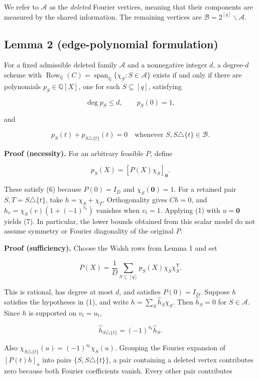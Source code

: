 \documentclass[
  10pt,
]{article}
\begin{document}
We refer to \(\mathcal A\) as the \emph{deleted} Fourier vertices, meaning that their components are measured by the shared information. The remaining vertices are \(\mathcal B=2^{[q]}\mathbin{\backslash}\mathcal A\).

\subsection{Lemma 2 (edge-polynomial formulation)}\label{lemma-2-edge-polynomial-formulation}

For a fixed admissible deleted family \(\mathcal A\) and a nonnegative integer \(d\), a degree-\(d\) scheme with \(\operatorname{Row}_{\mathbb Q}(C)=\operatorname{span}_{\mathbb Q}\{\chi_S:S\in\mathcal A\}\) exists if and only if there are polynomials \(p_S\in\mathbb Q[X]\), one for each \(S\subseteq[q]\), satisfying

\[
 \deg p_S\le d,\qquad p_S(0)=1,\tag{6}
\]

and

\[
 p_S(t)+p_{S\triangle\{t\}}(t)=0
 \quad\text{whenever } S,S\triangle\{t\}\in\mathcal B.\tag{7}
\]

\textbf{Proof (necessity).} For an arbitrary feasible \(P\), define

\[
 p_S(X)=[P(X)\chi_S]_{\mathbf0}.
\]

These satisfy (6) because \(P(0)=I_D\) and \(\chi_S(\mathbf0)=1\). For a retained pair \(S,T=S\triangle\{t\}\), take \(h=\chi_S+\chi_T\). Orthogonality gives \(Ch=0\), and \(h_v=\chi_S(v)(1+(-1)^{v_t})\) vanishes when \(v_t=1\). Applying (1) with \(u=\mathbf0\) yields (7). In particular, the lower bounds obtained from this scalar model do not assume symmetry or Fourier diagonality of the original \(P\).

\textbf{Proof (sufficiency).} Choose the Walsh rows from Lemma 1 and set

\[
 P(X)=\frac1D\sum_{S\subseteq[q]}p_S(X)\chi_S\chi_S^{\mathsf T}.\tag{8}
\]

This is rational, has degree at most \(d\), and satisfies \(P(0)=I_D\). Suppose \(h\) satisfies the hypotheses in (1), and write \(h=\sum_S\widehat h_S\chi_S\). Then \(\widehat h_S=0\) for \(S\in\mathcal A\). Since \(h\) is supported on \(v_t=u_t\),

\[
 \widehat h_{S\triangle\{t\}}=(-1)^{u_t}\widehat h_S.
\]

Also \(\chi_{S\triangle\{t\}}(u)=(-1)^{u_t}\chi_S(u)\). Grouping the Fourier expansion of \([P(t)h]_u\) into pairs \(\{S,S\triangle\{t\}\}\), a pair containing a deleted vertex contributes zero because both Fourier coefficients vanish. Every other pair contributes
\end{document}

